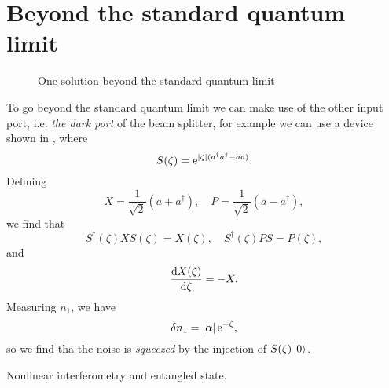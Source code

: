 \documentclass[hyperref, a4paper]{article}
\newcommand*{\ee}{\mathrm{e}}
\begin{document}
\section{Beyond the standard quantum limit}

\begin{figure}
    \centering
    
    \caption{One solution beyond the standard quantum limit}
    \label{fig:beyond-sql}
\end{figure}

To go beyond the standard quantum limit we can make use of the other input port, i.e. \emph{the dark port} of the beam splitter, for example we can use a device shown in , where 
\begin{equation}
    S(\zeta) = \ee^{\abs*{\zeta} (a^\dagger a^\dagger - a a)}.
\end{equation}
Defining
\begin{equation}
    X = \frac{1}{\sqrt{2}} (a + a^\dagger), \quad P = \frac{1}{\sqrt{2}} (a - a^\dagger),
\end{equation}
we find that 
\begin{equation}
    S^\dagger(\zeta) X S(\zeta) = X(\zeta) , \quad S^\dagger(\zeta) P S = P(\zeta), 
\end{equation}
and 
\begin{equation}
    \dv{X(\zeta)}{\zeta} = - X.
\end{equation}
Measuring $n_1$, we have 
\begin{equation}
    \var{n}_1 = \abs*{\alpha} \ee^{-\zeta}, 
\end{equation}
so we find tha the noise is \emph{squeezed} by the injection of $S(\zeta) \ket*{0}$.

Nonlinear interferometry and entangled state.
\end{document}
